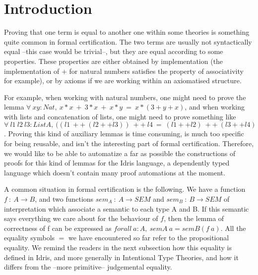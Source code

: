 \section{Introduction}

Proving that one term is equal to another one within some theories is something quite common in formal certification. The two terms are usually not syntactically equal --this case would be trivial--, but they are equal according to some properties. These properties are either obtained by implementation (the implementation of $+$ for natural numbers satisfies the property of associativity for example), or by axioms if we are working within an axiomatised structure. 

For example, when working with natural numbers, one might need to prove the lemma $\forall\ xy:Nat,\ x*x\ +\ 3*x\ +\ x*y\ =\ x*(3+y+x)$, and when working with lists and concatenation of lists, one might need to prove something like $\forall\ l1\ l2\ l3:List A,\ ((l1\ ++\ (l2 ++ l3))\ ++\ l4\ =\ (l1++l2)\ ++\ (l3++l4)$. Proving this kind of auxiliary lemmas is time consuming, is much too specific for being reusable, and isn't the interesting part of formal certification. Therefore, we would like to be able to automatize a far as possible the constructions of proofs for this kind of lemmas for the Idris language, a dependently typed language which doesn't contain many proof automations at the moment.

A common situation in formal certification is the following. We have a function $f\ :\ A \rightarrow B$, and two functions $sem_A\ :\ A \rightarrow SEM$ and $sem_B\ : \ B \rightarrow SEM$ of interpretation which associate a semantic to each type A and B. If this semantic says everything we care about for the behaviour of $f$, then the lemma of correctness of f can be expressed as $forall\ a:A,\ semA\ a = semB (f\ a)$.
All the equality symbols $=$ we have encountered so far refer to the propositional equality. We remind the readers in the next subsection how this equality is defined in Idris, and more generally in Intentional Type Theories, and how it differs from the --more primitive-- judgemental equality.

